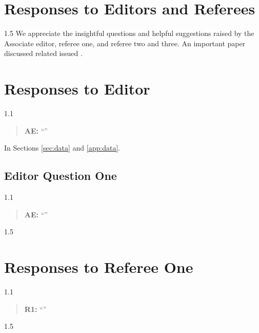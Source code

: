 \documentclass[12pt,english]{article}
\newcommand{\rrquote}{1.1}
\newcommand{\rrxspc}{1.5}
\begin{document}
\begin{refsection}
\section{Responses to Editors and Referees}
\begin{spacing}{\rrxspc}
We appreciate the insightful questions and helpful suggestions raised by the Associate editor, referee one, and referee two and three. An important paper discussed related issued \autocite{becker_human_1986, case_lasting_2005}. \blindtext
\end{spacing}

\section{Responses to Editor}
\begin{spacing}{\rrquote}
\end{spacing}
\begin{quotation}
\textbf{AE: }\enquote{\blindtext}
\end{quotation}

In Sections \ref{sec:data} and \ref{app:data}. \blindtext

\subsection{Editor Question One}
\begin{spacing}{\rrquote}
\begin{quotation}
\textbf{AE: }\enquote{\blindtext}
\end{quotation}
\end{spacing}

\begin{spacing}{\rrxspc}
\blindtext
\end{spacing}
\clearpage
\pagebreak

\section{Responses to Referee One}
\begin{spacing}{\rrquote}
\begin{quotation}
\textbf{R1: }\enquote{\blindtext}
\end{quotation}
\end{spacing}

\begin{spacing}{\rrxspc}
\blindtext
\end{spacing}


\end{refsection}
\end{document}
